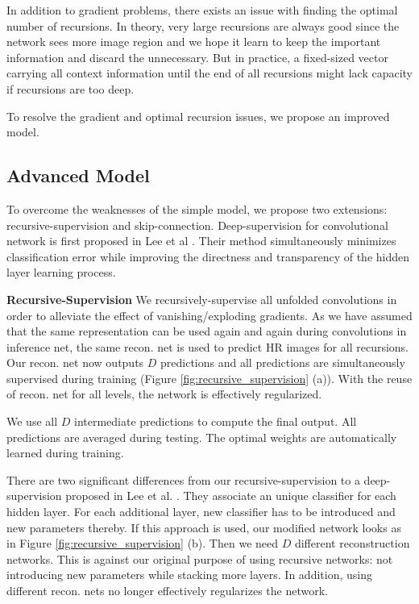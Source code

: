 \documentclass[10pt,twocolumn,letterpaper]{article}
\begin{document}
In addition to gradient problems, there exists an issue with finding the optimal number of recursions. In theory, very large recursions are always good since the network sees more image region and we hope it learn to keep the important information and discard the unnecessary.  But in practice, a fixed-sized vector carrying all context information until the end of all recursions might lack capacity if recursions are too deep. 

To resolve the gradient and optimal recursion issues, we propose an improved model.


\subsection{Advanced Model} 
To overcome the weaknesses of the simple model, we propose two extensions: recursive-supervision and skip-connection. Deep-supervision for convolutional network is first proposed in Lee et al  \cite{lee2014deeply}. Their method simultaneously minimizes classification error while improving the directness and transparency of the hidden layer learning process.

\textbf{Recursive-Supervision} We recursively-supervise all unfolded convolutions in order to alleviate the effect of vanishing/exploding gradients. As we have assumed that the same representation can be used again and again during convolutions in inference net, the same recon. net is used to predict HR images for all recursions. Our recon. net now outputs $D$ predictions and all predictions are simultaneously supervised during training (Figure \ref{fig:recursive_supervision} (a)). With the reuse of recon. net for all levels, the network is effectively regularized.

We use all $D$ intermediate predictions to compute the final output. All predictions are averaged during testing. The optimal weights are automatically learned during training. 

There are two significant differences from our recursive-supervision to a deep-supervision proposed in Lee et al. \cite{lee2014deeply}. They associate an unique classifier for each hidden layer. For each additional layer, new classifier has to be introduced and new parameters thereby. If this approach is used, our modified network looks as in Figure \ref{fig:recursive_supervision} (b). Then we need $D$ different reconstruction networks. This is against our original purpose of using recursive networks: not introducing new parameters while stacking more layers. In addition, using different recon. nets no longer effectively regularizes the network.
\end{document}
